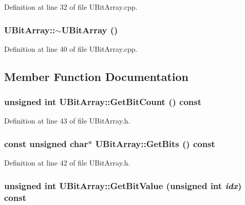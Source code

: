 Definition at line 32 of file UBitArray.cpp.\hypertarget{class_u_bit_array_745b48ebd9c9588d615961ffd86ddeed}{
\subsubsection[{$\sim$UBitArray}]{\setlength{\rightskip}{0pt plus 5cm}UBitArray::$\sim$UBitArray ()}}
\label{class_u_bit_array_745b48ebd9c9588d615961ffd86ddeed}




Definition at line 40 of file UBitArray.cpp.

\subsection{Member Function Documentation}
\hypertarget{class_u_bit_array_c6cf3c780c9bb99533551ce7b766b740}{
\subsubsection[{GetBitCount}]{\setlength{\rightskip}{0pt plus 5cm}unsigned int UBitArray::GetBitCount () const}}
\label{class_u_bit_array_c6cf3c780c9bb99533551ce7b766b740}




Definition at line 43 of file UBitArray.h.\hypertarget{class_u_bit_array_6452f2d20fe94f2de39da8b927c8bbc7}{
\subsubsection[{GetBits}]{\setlength{\rightskip}{0pt plus 5cm}const unsigned char$\ast$ UBitArray::GetBits () const}}
\label{class_u_bit_array_6452f2d20fe94f2de39da8b927c8bbc7}




Definition at line 42 of file UBitArray.h.\hypertarget{class_u_bit_array_6654e49916d787d8a50242bde1c581c7}{
\subsubsection[{GetBitValue}]{\setlength{\rightskip}{0pt plus 5cm}unsigned int UBitArray::GetBitValue (unsigned int {\em idx}) const}}
\label{class_u_bit_array_6654e49916d787d8a50242bde1c581c7}




